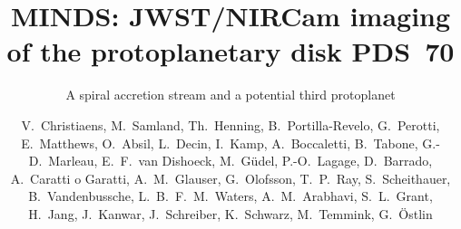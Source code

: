\documentclass[longauth]{aa}
\begin{document}
 
    
    
\title{MINDS: JWST/NIRCam imaging of the protoplanetary disk PDS~70}
\subtitle{A spiral accretion stream and a potential third protoplanet}

\author{V.~Christiaens\inst{\ref{KULeuven},\ref{STARLiege}}, %
M.~Samland\inst{\ref{MPIA}}, %
Th.~Henning\inst{\ref{MPIA}}, %
B.~Portilla-Revelo\inst{\ref{Kapteyn}}, %
G.~Perotti\inst{\ref{MPIA}}, %
E.~Matthews\inst{\ref{MPIA}}, %
O.~Absil\inst{\ref{STARLiege}}, %
L.~Decin\inst{\ref{KULeuven}}, %
I.~Kamp\inst{\ref{Kapteyn}}, %
A.~Boccaletti\inst{\ref{LESIA}}, 
B.~Tabone\inst{\ref{SaclayCNRSOrsay}},
G.-D.~Marleau\inst{\ref{Duisburg},\ref{Tuebingen},\ref{MPIA},\ref{Bern}},
E.~F.~van Dishoeck\inst{\ref{Leiden},\ref{MPE}}, M.~G\"udel\inst{\ref{AstroWien},\ref{ETHZ}}, P.-O.~Lagage\inst{\ref{SaclayCEAGif}}, %
D.~Barrado\inst{\ref{CABMadrid}}, A.~Caratti o Garatti\inst{\ref{INAFNapoli},\ref{IASDublin}}, 
A.~M.~Glauser\inst{\ref{ETHZ}}, G.~Olofsson\inst{\ref{AlbaNova}}, %
T.~P.~Ray\inst{\ref{IASDublin}}, S.~Scheithauer\inst{\ref{MPIA}}, B.~Vandenbussche\inst{\ref{KULeuven}}, L.~B.~F.~M.~Waters\inst{\ref{Radboud},\ref{SRON}},
A.~M.~Arabhavi\inst{\ref{Kapteyn}}, %
S.~L.~Grant\inst{\ref{MPE}}, H.~Jang\inst{\ref{Radboud}}, J.~Kanwar\inst{\ref{Kapteyn},\ref{IWFGraz},\ref{TUGraz}}, 
J.~Schreiber\inst{\ref{MPIA}}, K.~Schwarz\inst{\ref{MPIA}}, M.~Temmink\inst{\ref{Leiden}}, %
G.~\"Ostlin\inst{\ref{AlbaNova}}%
}
\end{document}
